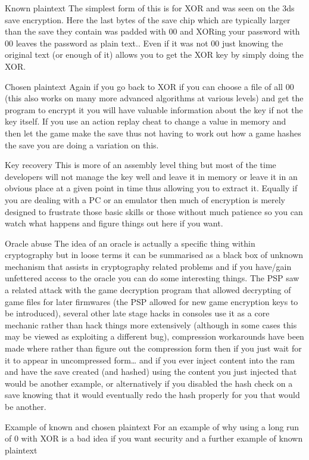 \documentclass[
]{book}
\begin{document}
Known plaintext The simplest form of this is for XOR and was seen on the 3ds save encryption. Here the last bytes of the save chip which are typically larger than the save they contain was padded with 00 and XORing your password with 00 leaves the password as plain text.. Even if it was not 00 just knowing the original text (or enough of it) allows you to get the XOR key by simply doing the XOR.

Chosen plaintext Again if you go back to XOR if you can choose a file of all 00 (this also works on many more advanced algorithms at various levels) and get the program to encrypt it you will have valuable information about the key if not the key itself. If you use an action replay cheat to change a value in memory and then let the game make the save thus not having to work out how a game hashes the save you are doing a variation on this.

Key recovery This is more of an assembly level thing but most of the time developers will not manage the key well and leave it in memory or leave it in an obvious place at a given point in time thus allowing you to extract it. Equally if you are dealing with a PC or an emulator then much of encryption is merely designed to frustrate those basic skills or those without much patience so you can watch what happens and figure things out here if you want.

Oracle abuse The idea of an oracle is actually a specific thing within cryptography but in loose terms it can be summarised as a black box of unknown mechanism that assists in cryptography related problems and if you have/gain unfettered access to the oracle you can do some interesting things. The PSP saw a related attack with the game decryption program that allowed decrypting of game files for later firmwares (the PSP allowed for new game encryption keys to be introduced), several other late stage hacks in consoles use it as a core mechanic rather than hack things more extensively (although in some cases this may be viewed as exploiting a different bug), compression workarounds have been made where rather than figure out the compression form then if you just wait for it to appear in uncompressed form\ldots{} and if you ever inject content into the ram and have the save created (and hashed) using the content you just injected that would be another example, or alternatively if you disabled the hash check on a save knowing that it would eventually redo the hash properly for you that would be another.

Example of known and chosen plaintext For an example of why using a long run of 0 with XOR is a bad idea if you want security and a further example of known plaintext
\end{document}
